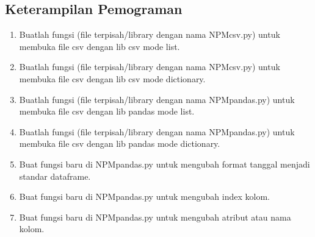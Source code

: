 	\subsection{Keterampilan Pemograman}
		\begin{enumerate}
			\item Buatlah  fungsi  (file  terpisah/library  dengan  nama  NPMcsv.py)  untuk  membuka file csv dengan lib csv mode list.
			
	
			\item Buatlah  fungsi  (file  terpisah/library  dengan  nama  NPMcsv.py)  untuk  membuka file csv dengan lib csv mode dictionary.
			
			
			\item Buatlah fungsi (file terpisah/library dengan nama NPMpandas.py) untuk membuka file csv dengan lib pandas mode list.	
			
			
			\item Buatlah fungsi (file terpisah/library dengan nama NPMpandas.py) untuk membuka file csv dengan lib pandas mode dictionary.			
			
			
			\item  Buat fungsi baru di NPMpandas.py untuk mengubah format tanggal menjadi standar dataframe.			
			
			
			\item Buat fungsi baru di NPMpandas.py untuk mengubah index kolom.			
			
			
			\item Buat fungsi baru di NPMpandas.py untuk mengubah atribut atau nama kolom.			
			
			

\end{enumerate}

